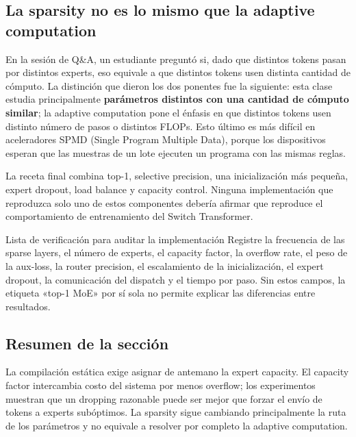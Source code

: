 \subsection{La sparsity no es lo mismo que la adaptive computation}

En la sesión de Q\&A, un estudiante preguntó si, dado que distintos tokens pasan por distintos experts, eso equivale a que distintos tokens usen distinta cantidad de cómputo. La distinción que dieron los dos ponentes fue la siguiente: esta clase estudia principalmente \textbf{parámetros distintos con una cantidad de cómputo similar}; la adaptive computation pone el énfasis en que distintos tokens usen distinto número de pasos o distintos FLOPs. Esto último es más difícil en aceleradores SPMD (Single Program Multiple Data), porque los dispositivos esperan que las muestras de un lote ejecuten un programa con las mismas reglas.


La receta final combina top-1, selective precision, una inicialización más pequeña, expert dropout, load balance y capacity control. Ninguna implementación que reproduzca solo uno de estos componentes debería afirmar que reproduce el comportamiento de entrenamiento del Switch Transformer.


\begin{importantbox}{Lista de verificación para auditar la implementación}
Registre la frecuencia de las sparse layers, el número de experts, el capacity factor, la overflow rate, el peso de la aux-loss, la router precision, el escalamiento de la inicialización, el expert dropout, la comunicación del dispatch y el tiempo por paso. Sin estos campos, la etiqueta «top-1 MoE» por sí sola no permite explicar las diferencias entre resultados.
\end{importantbox}

\subsection{Resumen de la sección}

La compilación estática exige asignar de antemano la expert capacity. El capacity factor intercambia costo del sistema por menos overflow; los experimentos muestran que un dropping razonable puede ser mejor que forzar el envío de tokens a experts subóptimos. La sparsity sigue cambiando principalmente la ruta de los parámetros y no equivale a resolver por completo la adaptive computation.
